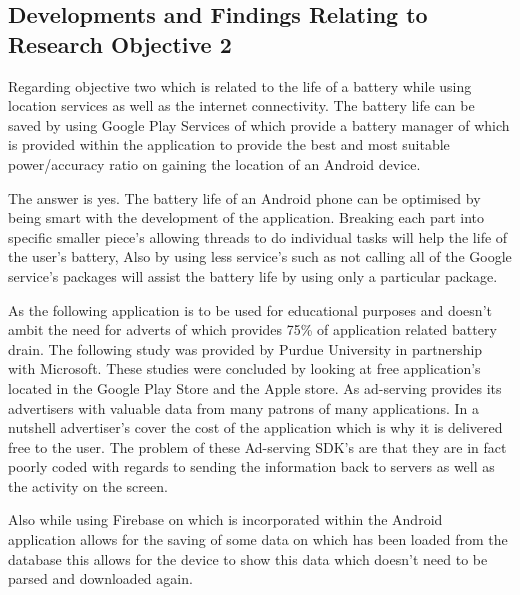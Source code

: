 \subsection{Developments and Findings Relating to Research Objective 2}
Regarding objective two which is related to the life of a battery while using location services as well as the internet connectivity. The battery life can be saved by using Google Play Services of which provide a battery manager of which is provided within the application to provide the best and most suitable power/accuracy ratio on gaining the location of an Android device.

The answer is yes. The battery life of an Android phone can be optimised by being smart with the development of the application. Breaking each part into specific smaller piece’s allowing threads to do individual tasks will help the life of the user’s battery, Also by using less service’s such as not calling all of the Google service’s packages will assist the battery life by using only a particular package. \cite{andBatt}

As the following application is to be used for educational purposes and doesn't ambit the need for adverts of which provides 75\% of application related battery drain. The following study was provided by Purdue University in partnership with Microsoft. These studies were concluded by looking at free application's located in the Google Play Store and the Apple store. As ad-serving provides its advertisers with valuable data from many patrons of many applications. In a nutshell advertiser's cover the cost of the application which is why it is delivered free to the user. The problem of these Ad-serving SDK's are that they are in fact poorly coded with regards to sending the information back to servers as well as the activity on the screen.\cite{admob} 

Also while using Firebase on which is incorporated within the Android application allows for the saving of some data on which has been loaded from the database this allows for the device to show this data which doesn't need to be parsed and downloaded again.

